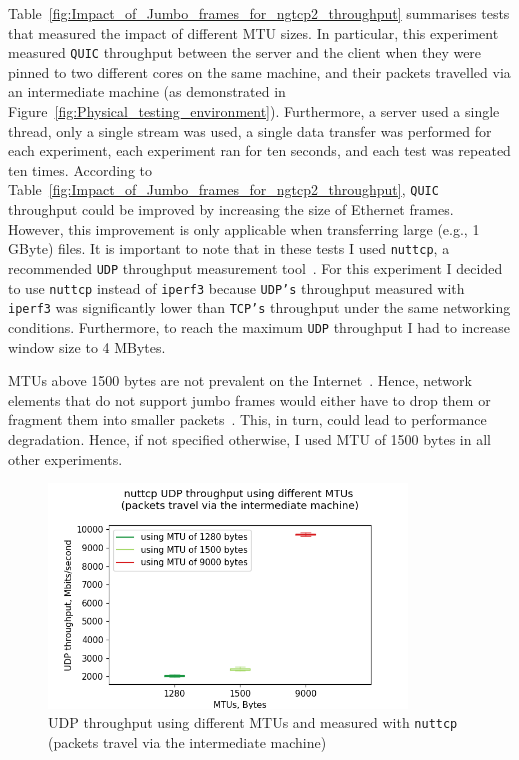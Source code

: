 \documentclass[12pt,a4paper,twoside,openright]{report}
\begin{document}
  
   Table~\ref{fig:Impact_of_Jumbo_frames_for_ngtcp2_throughput} summarises tests that measured the impact of different MTU sizes.    
    In particular, this experiment measured \texttt{QUIC} throughput between the server and the client when they were pinned to two different cores on the same machine, and their packets travelled via an intermediate machine (as demonstrated in Figure~\ref{fig:Physical_testing_environment}).
    Furthermore, a server used a single thread, only a single stream was used, a single data transfer was performed for each experiment, each experiment ran for ten seconds, and each test was repeated ten times.
    According to Table~\ref{fig:Impact_of_Jumbo_frames_for_ngtcp2_throughput}, \texttt{QUIC} throughput could be improved by increasing the size of Ethernet frames.
    However, this improvement is only applicable when transferring large (e.g., 1 GByte) files.
    It is important to note that in these tests I used \texttt{nuttcp}, a recommended \texttt{UDP} throughput measurement tool~\cite{network-troubleshooting-tools_nuttcp}.
    For this experiment I decided to use \texttt{nuttcp} instead of \texttt{iperf3} because  \texttt{UDP's} throughput measured with \texttt{iperf3} was significantly lower than \texttt{TCP's} throughput under the same networking conditions.
    Furthermore, to reach the maximum \texttt{UDP} throughput I had to increase window size to 4 MBytes.
    
    MTUs above 1500 bytes are not prevalent on the Internet~\cite{why-is-ethernet-mtu-1500}.
    Hence, network elements that do not support jumbo frames would either have to drop them or fragment them into smaller packets~\cite{Large_MTUs_and_Internet_Performance}.
    This, in turn, could lead to performance degradation.
    Hence, if not specified otherwise, I used MTU of 1500 bytes in all other experiments.
    
    
  
  
    \begin{figure}[H]
    \centering
    \includegraphics[width=0.85\textwidth]{figs/UDP throughput using different MTUs and measured with nuttcp (packets travel via the intermediate machine).png}
    \caption{UDP throughput using different MTUs and measured with \texttt{nuttcp} (packets travel via the intermediate machine)}
    \label{fig:UDP_throughput_with_different_MTUs}
    \end{figure}
    
\end{document}
